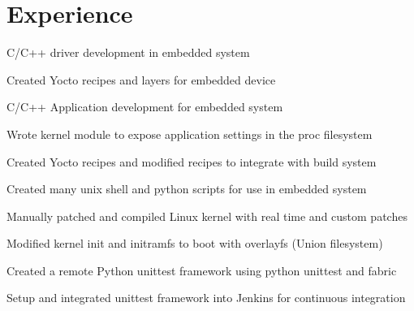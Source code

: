 \documentclass[]{deedy-resume-openfont}
\begin{document}
\begin{minipage}[t]{0.66\textwidth} 


\section{Experience}

\begin{tightemize}
\item C/C++ driver development in embedded system
\item Created Yocto recipes and layers for embedded device
\end{tightemize}
\sectionsep

\begin{tightemize}
\item C/C++ Application development for embedded system
\item Wrote kernel module to expose application settings in the proc filesystem
\item Created Yocto recipes and modified recipes to integrate with build system
\end{tightemize}
\sectionsep

\begin{tightemize}
\item Created many unix shell and python scripts for use in embedded system
\item Manually patched and compiled Linux kernel with real time and custom patches
\item Modified kernel init and initramfs to boot with overlayfs (Union filesystem)
\end{tightemize}
\sectionsep

\begin{tightemize}
\item Created a remote Python unittest framework using python unittest and fabric
\item Setup and integrated unittest framework into Jenkins for continuous integration
\end{tightemize}
\sectionsep


\end{minipage}
\end{document}
